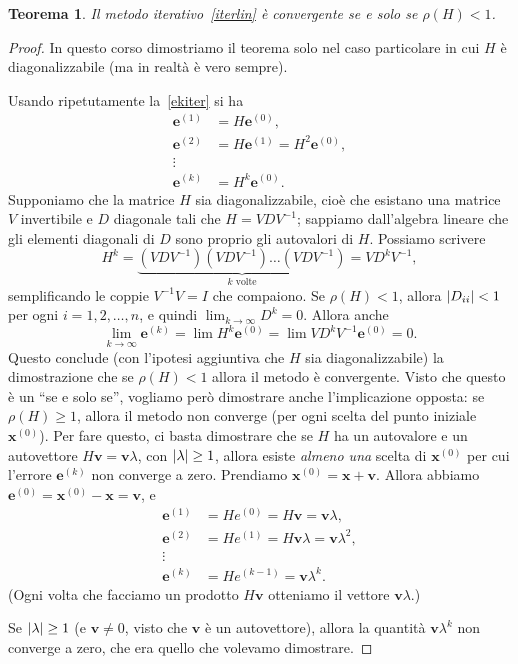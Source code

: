 \documentclass[a4paper]{report}
\DeclarePairedDelimiter{\abs}{\lvert}{\rvert}
\newtheorem{theorem}{Teorema}[chapter]
\theoremstyle{definition}
\theoremstyle{remark}
\newcommand{\x}{\mathbf{x}}
\newcommand{\e}{\mathbf{e}}
\begin{document}
\begin{theorem}
Il metodo iterativo~\eqref{iterlin} è convergente se e solo se $\rho(H) < 1$.
\end{theorem}
\begin{proof}
In questo corso dimostriamo il teorema solo nel caso particolare in cui $H$ è diagonalizzabile (ma in realtà è vero sempre).

Usando ripetutamente la~\eqref{ekiter} si ha
\begin{align*}
  \e^{(1)} &= H \e^{(0)},\\
  \e^{(2)} &= H \e^{(1)} = H^2 \e^{(0)},\\
  \vdots\\
  \e^{(k)} &= H^k \e^{(0)}.
\end{align*}
Supponiamo che la matrice $H$ sia diagonalizzabile, cioè che esistano una matrice $V$ invertibile e $D$ diagonale tali che $H = VDV^{-1}$; sappiamo dall'algebra lineare che gli elementi diagonali di $D$ sono proprio gli autovalori di $H$. Possiamo scrivere
\[
H^k = \underbrace{(VDV^{-1})(VDV^{-1}) \dots (VDV^{-1})}_{\text{$k$ volte}} = VD^kV^{-1},
\]
semplificando le coppie $V^{-1}V=I$ che compaiono. Se $\rho(H) < 1$, allora $\abs{D_{ii}} < 1$ per ogni $i=1,2,\dots,n$, e quindi $\lim_{k\to\infty} D^k = 0$. Allora anche
\[
\lim_{k\to\infty} \mathbf{e}^{(k)} = \lim H^k \mathbf{e}^{(0)} = \lim VD^k V^{-1} \mathbf{e}^{(0)} = 0.
\]
Questo conclude (con l'ipotesi aggiuntiva che $H$ sia diagonalizzabile) la dimostrazione che se $\rho(H)<1$ allora il metodo è convergente. Visto che questo è un ``se e solo se'', vogliamo però dimostrare anche l'implicazione opposta: se $\rho(H)\geq 1$, allora il metodo non converge (per ogni scelta del punto iniziale $\x^{(0)}$). Per fare questo, ci basta dimostrare che se $H$ ha un autovalore e un autovettore $H\mathbf{v} = \mathbf{v} \lambda$, con $\abs{\lambda} \geq 1$, allora esiste \emph{almeno una} scelta di $\x^{(0)}$ per cui l'errore $\e^{(k)}$ non converge a zero. Prendiamo $\x^{(0)} = \x + \mathbf{v}$. Allora abbiamo $\e^{(0)} = \x^{(0)} - \x = \mathbf{v}$, e 
\begin{align*} \label{nonconverge}
    \e^{(1)} &= He^{(0)} = H\mathbf{v} = \mathbf{v}\lambda,\\
    \e^{(2)} &= He^{(1)} = H\mathbf{v}\lambda = \mathbf{v}\lambda^2,\\
    \vdots\\
    \e^{(k)} &= H e^{(k-1)} = \mathbf{v} \lambda^k.
\end{align*}
(Ogni volta che facciamo un prodotto $H\mathbf{v}$ otteniamo il vettore $\mathbf{v}\lambda$.)

Se $\abs{\lambda} \geq 1$ (e $\mathbf{v}\neq 0$, visto  che $\mathbf{v}$ è un autovettore), allora la quantità $\mathbf{v} \lambda^k$ non converge a zero, che era quello che volevamo dimostrare.
\end{proof}
\end{document}
